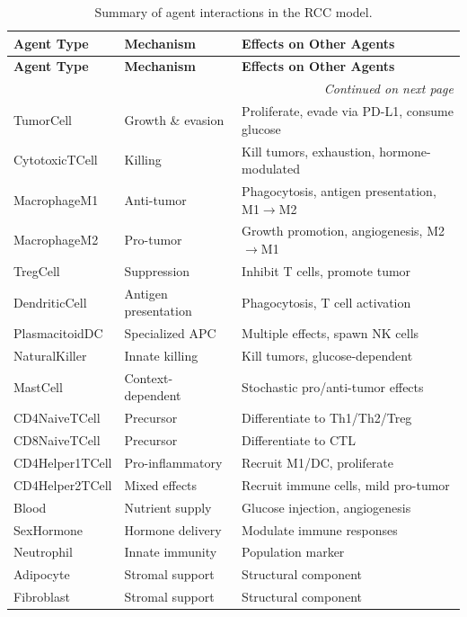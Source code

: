 \begin{longtable}{@{}p{3.2cm}p{4cm}p{7cm}@{}}
\caption{Summary of agent interactions in the RCC model.}
\label{tab:interactions} \\
\toprule
\textbf{Agent Type} & \textbf{Mechanism} & \textbf{Effects on Other Agents} \\
\midrule
\endfirsthead
\toprule
\textbf{Agent Type} & \textbf{Mechanism} & \textbf{Effects on Other Agents} \\
\midrule
\endhead
\midrule
\multicolumn{3}{r}{\emph{Continued on next page}} \\
\bottomrule
\endfoot
\bottomrule
\endlastfoot

TumorCell & Growth \& evasion & Proliferate, evade via PD-L1, consume glucose \\
CytotoxicTCell & Killing & Kill tumors, exhaustion, hormone-modulated \\
MacrophageM1 & Anti-tumor & Phagocytosis, antigen presentation, M1$\to$M2 \\
MacrophageM2 & Pro-tumor & Growth promotion, angiogenesis, M2$\to$M1 \\
TregCell & Suppression & Inhibit T cells, promote tumor \\
DendriticCell & Antigen presentation & Phagocytosis, T cell activation \\
PlasmacitoidDC & Specialized APC & Multiple effects, spawn NK cells \\
NaturalKiller & Innate killing & Kill tumors, glucose-dependent \\
MastCell & Context-dependent & Stochastic pro/anti-tumor effects \\
CD4NaiveTCell & Precursor & Differentiate to Th1/Th2/Treg \\
CD8NaiveTCell & Precursor & Differentiate to CTL \\
CD4Helper1TCell & Pro-inflammatory & Recruit M1/DC, proliferate \\
CD4Helper2TCell & Mixed effects & Recruit immune cells, mild pro-tumor \\
Blood & Nutrient supply & Glucose injection, angiogenesis \\
SexHormone & Hormone delivery & Modulate immune responses \\
Neutrophil & Innate immunity & Population marker \\
Adipocyte & Stromal support & Structural component \\
Fibroblast & Stromal support & Structural component \\

\end{longtable}

